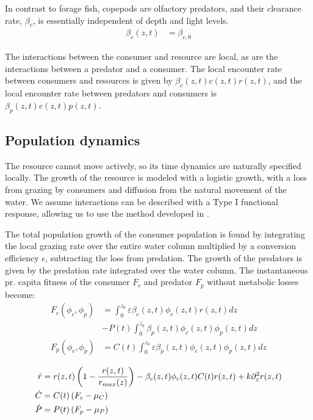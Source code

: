 In contrast to forage fish, copepods are olfactory predators, and their clearance rate, $\beta_c$, is essentially independent of depth and light levels.
\begin{align*}
	\beta_c(z,t) &=  \beta_{c,0}
\end{align*}

The interactions between the consumer and resource are local, as are the interactions between a predator and a consumer. The local encounter rate between consumers and resources is given by $\beta_c(z,t)c(z,t)r(z,t)$, and the local encounter rate between predators and consumers is $\beta_p(z,t)c(z,t)p(z,t)$.

\subsection{Population dynamics}

The resource cannot move actively, so its time dynamics are naturally specified locally. The growth of the resource is modeled with a logistic growth, with a loss from grazing by consumers and diffusion from the natural movement of the water. We assume interactions can be described with a Type I functional response, allowing us to use the method developed in . %


The total population growth of the consumer population is found by integrating the local grazing rate over the entire water column multiplied by a conversion efficiency $\epsilon$, subtracting the loss from predation. The growth of the predators is given by the predation rate integrated over the water column. The instantaneous pr. capita fitness of the consumer $F_c$ and predator $F_p$ without metabolic losses become:
\begin{align}
	F_c(\phi_c, \phi_p) &= \int_0^{z_0} \varepsilon \beta_c(z,t)\phi_c(z,t)r(z,t) dz\\ &- P(t)\int_0^{z_0} \beta_p(z,t) \phi_c(z,t) \phi_p(z,t)dz \\
	F_p(\phi_c, \phi_p) &=  C(t) \int_0^{z_0} \varepsilon \beta_p(z,t)\phi_c(z,t)\phi_p(z,t) dz
  \label{eq:fitness}
\end{align}

\begin{align}
	\dot{r} &= r(z,t)\pa{1-\frac{r(z,t)}{r_{max}(z)}} - \beta_c(z,t)\phi_c(z,t)C(t) r(z,t)  + k \partial_z^2 r(z,t)\\
	\dot{C} &= C(t)\left ( F_c - \mu_C \right ) \\
	\dot{P} &= P(t) \left ( F_p - \mu_P  \right )
  \label{eq:population_growth_prob_dens}
\end{align}

